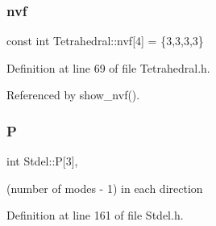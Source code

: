 \mbox{\label{classTetrahedral_a125bebfad5bc1c6577425cc24e287caf}} 
\subsubsection{\texorpdfstring{nvf}{nvf}}
{\footnotesize\ttfamily const int Tetrahedral\+::nvf\mbox{[}4\mbox{]} = \{3,3,3,3\}\hspace{0.3cm}{\ttfamily [private]}}



Definition at line 69 of file Tetrahedral.\+h.



Referenced by show\+\_\+nvf().

\mbox{\label{classStdel_a05cbb3f2a3fa0bc04a74e347dc6574cf}} 
\subsubsection{\texorpdfstring{P}{P}}
{\footnotesize\ttfamily int Stdel\+::P\mbox{[}3\mbox{]}\hspace{0.3cm}{\ttfamily [protected]}, {\ttfamily [inherited]}}



(number of modes -\/ 1) in each direction 



Definition at line 161 of file Stdel.\+h.



